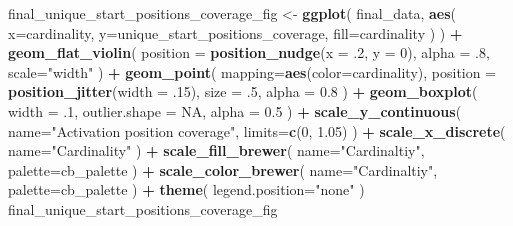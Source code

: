 \documentclass[]{book}
\newenvironment{Shaded}{\begin{snugshade}}{\end{snugshade}}
\newcommand{\DataTypeTok}[1]{\textcolor[rgb]{0.13,0.29,0.53}{#1}}
\newcommand{\DecValTok}[1]{\textcolor[rgb]{0.00,0.00,0.81}{#1}}
\newcommand{\FloatTok}[1]{\textcolor[rgb]{0.00,0.00,0.81}{#1}}
\newcommand{\KeywordTok}[1]{\textcolor[rgb]{0.13,0.29,0.53}{\textbf{#1}}}
\newcommand{\NormalTok}[1]{#1}
\newcommand{\OperatorTok}[1]{\textcolor[rgb]{0.81,0.36,0.00}{\textbf{#1}}}
\newcommand{\OtherTok}[1]{\textcolor[rgb]{0.56,0.35,0.01}{#1}}
\newcommand{\StringTok}[1]{\textcolor[rgb]{0.31,0.60,0.02}{#1}}
\begin{document}
\begin{Shaded}
\begin{Highlighting}[]
\NormalTok{final_unique_start_positions_coverage_fig <-}\StringTok{ }\KeywordTok{ggplot}\NormalTok{(}
\NormalTok{    final_data,}
    \KeywordTok{aes}\NormalTok{(}
      \DataTypeTok{x=}\NormalTok{cardinality,}
      \DataTypeTok{y=}\NormalTok{unique_start_positions_coverage,}
      \DataTypeTok{fill=}\NormalTok{cardinality}
\NormalTok{    )}
\NormalTok{  ) }\OperatorTok{+}
\StringTok{  }\KeywordTok{geom_flat_violin}\NormalTok{(}
    \DataTypeTok{position =} \KeywordTok{position_nudge}\NormalTok{(}\DataTypeTok{x =} \FloatTok{.2}\NormalTok{, }\DataTypeTok{y =} \DecValTok{0}\NormalTok{),}
    \DataTypeTok{alpha =} \FloatTok{.8}\NormalTok{,}
    \DataTypeTok{scale=}\StringTok{"width"}
\NormalTok{  ) }\OperatorTok{+}
\StringTok{  }\KeywordTok{geom_point}\NormalTok{(}
    \DataTypeTok{mapping=}\KeywordTok{aes}\NormalTok{(}\DataTypeTok{color=}\NormalTok{cardinality),}
    \DataTypeTok{position =} \KeywordTok{position_jitter}\NormalTok{(}\DataTypeTok{width =} \FloatTok{.15}\NormalTok{),}
    \DataTypeTok{size =} \FloatTok{.5}\NormalTok{,}
    \DataTypeTok{alpha =} \FloatTok{0.8}
\NormalTok{  ) }\OperatorTok{+}
\StringTok{  }\KeywordTok{geom_boxplot}\NormalTok{(}
    \DataTypeTok{width =} \FloatTok{.1}\NormalTok{,}
    \DataTypeTok{outlier.shape =} \OtherTok{NA}\NormalTok{,}
    \DataTypeTok{alpha =} \FloatTok{0.5}
\NormalTok{  ) }\OperatorTok{+}
\StringTok{  }\KeywordTok{scale_y_continuous}\NormalTok{(}
    \DataTypeTok{name=}\StringTok{"Activation position coverage"}\NormalTok{,}
    \DataTypeTok{limits=}\KeywordTok{c}\NormalTok{(}\DecValTok{0}\NormalTok{, }\FloatTok{1.05}\NormalTok{)}
\NormalTok{  ) }\OperatorTok{+}
\StringTok{  }\KeywordTok{scale_x_discrete}\NormalTok{(}
    \DataTypeTok{name=}\StringTok{"Cardinality"}
\NormalTok{  ) }\OperatorTok{+}
\StringTok{  }\KeywordTok{scale_fill_brewer}\NormalTok{(}
    \DataTypeTok{name=}\StringTok{"Cardinaltiy"}\NormalTok{,}
    \DataTypeTok{palette=}\NormalTok{cb_palette}
\NormalTok{  ) }\OperatorTok{+}
\StringTok{  }\KeywordTok{scale_color_brewer}\NormalTok{(}
    \DataTypeTok{name=}\StringTok{"Cardinaltiy"}\NormalTok{,}
    \DataTypeTok{palette=}\NormalTok{cb_palette}
\NormalTok{  ) }\OperatorTok{+}
\StringTok{  }\KeywordTok{theme}\NormalTok{(}
    \DataTypeTok{legend.position=}\StringTok{"none"}
\NormalTok{  )}
\NormalTok{final_unique_start_positions_coverage_fig}
\end{Highlighting}
\end{Shaded}
\end{document}
